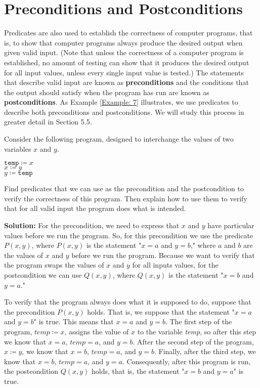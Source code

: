 \documentclass{Axon}
\begin{document}
\section{Preconditions and Postconditions}
Predicates are also used to establish the correctness of computer programs, that is, to show that computer programs always produce the desired output when given valid input. (Note that unless the correctness of a computer program is established, no amount of testing can show that it produces the desired output for all input values, unless every single input value is tested.) The statements that describe valid input are known as \textbf{preconditions} and the conditions that the output should satisfy when the program has run are known as \textbf{postconditions}. As Example \ref{Example: 7} illustrates, we use predicates to describe both preconditions and postconditions. We will study this process in greater detail in Section 5.5.

\begin{example}\label{Example: 7}
    Consider the following program, designed to interchange the values of two variables \(x\) and \(y\).
    
    \begin{center}
        \(\texttt{temp} \coloneq x\) \\
        \(x \coloneq y\)             \\
        \(y \coloneq \texttt{temp}\)
    \end{center}

    Find predicates that we can use as the precondition and the postcondition to verify the correctness of this program. Then explain how to use them to verify that for all valid input the program does what is intended.

    \noindent
    \textbf{Solution:}
    For the precondition, we need to express that \(x\) and \(y\) have particular values before we run the program. So, for this precondition we use the predicate \(P(x, y)\), where \(P(x, y)\) is the statement "\(x = a\) and \(y = b\)," where \(a\) and \(b\) are the values of \(x\) and \(y\) before we run the program. Because we want to verify that the program swaps the values of \(x\) and \(y\) for all inputs values, for the postcondition we can use \(Q(x, y)\), where \(Q(x, y)\) is the statement "\(x = b\) and \(y = a\)."

    To verify that the program always does what it is supposed to do, suppose that the precondition \(P(x, y)\) holds. That is, we suppose that the statement "\(x = a\) and \(y = b\)" is true. This means that \(x = a\) and \(y = b\). The first step of the program, \(\textit{temp} \coloneq x\), assigns the value of \(x\) to the variable \textit{temp}, so after this step we know that \(x = a\), \(\textit{temp} = a\), and \(y = b\). After the second step of the program, \(x \coloneq y\), we know that \(x = b\), \(\textit{temp} = a\), and \(y = b\). Finally, after the third step, we know that \(x = b\), \(\textit{temp} = a\), and \(y = a\). Consequently, after this program is run, the postcondition \(Q(x, y)\) holds, that is, the statement "\(x = b\) and \(y = a\)" is true.
\end{example}

\printbibliography
\end{document}
